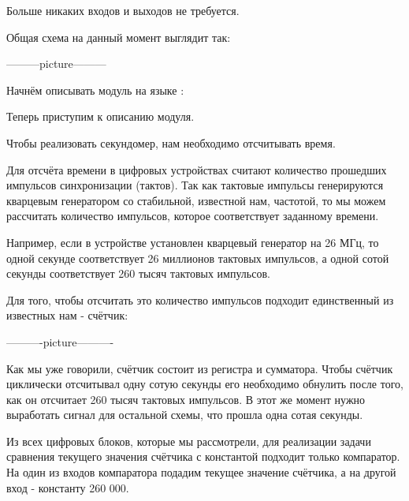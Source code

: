 \par{Больше никаких входов и выходов не требуется.}
\par{Общая схема на данный момент выглядит так:}

\par{---------picture---------}

\par{Начнём описывать модуль на языке :}



\par{Теперь приступим к описанию  модуля.}

\par{Чтобы реализовать секундомер, нам необходимо отсчитывать время.}

\par{Для отсчёта времени в цифровых устройствах считают количество прошедших импульсов синхронизации (тактов). Так как тактовые импульсы генерируются кварцевым генератором со стабильной, известной нам, частотой, то мы можем рассчитать количество импульсов, которое соответствует заданному времени.}

\par{Например, если в устройстве установлен кварцевый генератор на 26 МГц, то одной секунде соответствует 26 миллионов тактовых импульсов, а одной сотой секунды соответствует 260 тысяч тактовых импульсов.}

\par{Для того, чтобы отсчитать это количество импульсов подходит единственный из известных нам  - счётчик:}

\par{----------picture----------}

\par{Как мы уже говорили, счётчик состоит из регистра и сумматора. Чтобы счётчик циклически отсчитывал одну сотую секунды его необходимо обнулить после того, как он отсчитает 260 тысяч тактовых импульсов. В этот же момент нужно выработать сигнал для остальной схемы, что прошла одна сотая секунды.}

\par{Из всех цифровых блоков, которые мы рассмотрели, для реализации задачи сравнения текущего значения счётчика с константой подходит только компаратор. На один из входов компаратора подадим текущее значение счётчика, а на другой вход - константу 260 000.}

